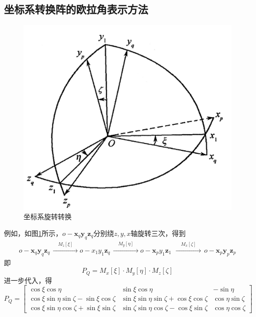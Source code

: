 
\subsection{坐标系转换阵的欧拉角表示方法}
\vspace*{-1em}

\begin{figure}[!htb]
	\centering
	\includegraphics[width=0.3\linewidth]{pic/欧拉角.jpg}
	\caption{坐标系旋转转换}
	\label{欧拉角}
\end{figure}

例如，如图\ref{欧拉角}所示，$o-\bm{x}_q\bm{y}_q\bm{z}_q$分别绕$z,y,x$轴旋转三次，得到
\begin{equation*}
	\begin{split}
		o-\bm{x}_q\bm{y}_q\bm{z}_q \, \xrightarrow{\quad \textstyle M_z[\xi] \quad } o - x_1 y_1 \bm{z}_q \, \xrightarrow{\quad \textstyle M_y[\eta] \quad } o - \bm{x}_p y_1 \bm{z}_1\ \, \xrightarrow{\quad \textstyle M_x[\zeta] \quad } \,o - \bm{x}_p \bm{y}_p \bm{z}_p
	\end{split}
\end{equation*}
即
\begin{equation}
	P_Q = M_x[\xi] \cdot  M_y[\eta]\cdot  M_z[\zeta]
\end{equation}
进一步代入，得
\begin{equation}
	P_Q = 
	\begin{bmatrix}
		\cos \xi \cos \eta & \sin \xi \cos \eta & - \sin \eta \\
		\cos \xi \sin \eta \sin \zeta - \sin \xi \cos \zeta & \sin \xi \sin \eta \sin \zeta + \cos \xi \cos \zeta & \cos \eta \sin \zeta \\
		\cos \xi \sin \eta \cos \zeta + \sin \xi \sin \zeta & \sin \zeta \sin \eta \cos \zeta - \cos \xi \sin \zeta & \cos \eta \cos \zeta
	\end{bmatrix}
\end{equation}

